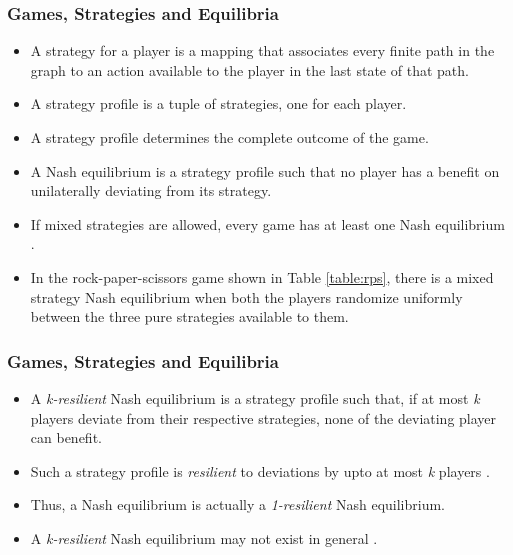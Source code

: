 \documentclass{beamer}
\begin{document}
\begin{frame}
 \frametitle{Games, Strategies and Equilibria}
\begin{itemize}
	\item A strategy for a player is a mapping that associates every finite path in the graph to an action available to the player in the last state of that path.
	\item A strategy profile is a tuple of strategies, one for each player.
	\item A strategy profile determines the complete outcome of the game.
	\item A Nash equilibrium is a strategy profile such that no player has a benefit on unilaterally deviating from its strategy.
	\item If mixed strategies are allowed, every game has at least one Nash equilibrium \cite{12}.
	\item In the rock-paper-scissors game shown in Table \ref{table:rps}, there is a mixed strategy Nash equilibrium when both the players randomize uniformly between the three pure strategies available to them.
\end{itemize}
\end{frame}

\begin{frame}
 \frametitle{Games, Strategies and Equilibria}
\begin{itemize}
	\item A \textit{k-resilient} Nash equilibrium is a strategy profile such that, if at most \textit{k} players deviate from their respective strategies, none of the deviating player can benefit.
	\item Such a strategy profile is \textit{resilient} to deviations by upto at most \textit{k} players \cite{Abraham-2006,Abraham-2008}.
	\item Thus, a Nash equilibrium is actually a \textit{1-resilient} Nash equilibrium.
	\item A \textit{k-resilient} Nash equilibrium may not exist in general \cite{Abraham-2006,Abraham-2008}.
\end{itemize}
\end{frame}
\end{document}
